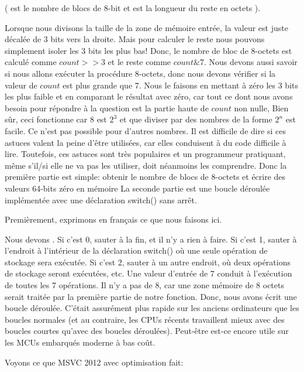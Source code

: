 (  est le nombre de blocs de 8-bit et  est la longueur du reste en octets ).

Lorsque nous divisons la taille de la zone de mémoire entrée, la valeur est juste
décalée de 3 bits vers la droite.
Mais pour calculer le reste nous pouvons simplement isoler les 3 bits les plus bas!
Donc, le nombre de bloc de 8-octets est calculé comme $count>>3$ et le reste comme
$count \& 7$.
Nous devons aussi savoir si nous allons exécuter la procédure 8-octets, donc nous
devons vérifier si la valeur de $count$ est plus grande que 7.
Nous le faisons en mettant à zéro les 3 bits les plus faible et en comparant le résultat
avec zéro, car tout ce dont nous avons besoin pour répondre à la question est la partie
haute de $count$ non nulle,
Bien sûr, ceci fonctionne car 8 est $2^{3}$ et que diviser par des nombres de la
forme $2^n$ est facile.
Ce n'est pas possible pour d'autres nombres.
Il est difficile de dire si ces astuces valent la peine d'être utilisées, car elles
conduisent à du code difficile à lire.
Toutefois, ces astuces sont très populaires et un programmeur pratiquant, même s'il/si elle
ne va pas les utiliser, doit néanmoins les comprendre.
Donc la première partie est simple: obtenir le nombre de blocs de 8-octets et écrire
des valeurs 64-bits zéro en mémoire
La seconde partie est une boucle déroulée implémentée avec une déclaration switch()
sans arrêt.

Premièrement, exprimons en français ce que nous faisons ici.

Nous devons .
Si c'est 0, sauter à la fin, et il n'y a rien à faire.
Si c'est 1, sauter à l'endroit à l'intérieur de la déclaration switch() où une seule
opération de stockage sera exécutée.
Si c'est 2, sauter à un autre endroit, où deux opérations de stockage seront exécutées, etc.
Une valeur d'entrée de 7 conduit à l'exécution de toutes les 7 opérations.
Il n'y a pas de 8, car une zone mémoire de 8 octets serait traitée par la première
partie de notre fonction.
Donc, nous avons écrit une boucle déroulée.
C'était assurément plus rapide sur les anciens ordinateurs que les boucles normales
(et au contraire, les \ac{CPU}s récents travaillent mieux avec des boucles courtes
qu'avec des boucles déroulées).
Peut-être est-ce encore utile sur les \ac{MCU}s embarqués moderne à bas coût.

Voyons ce que MSVC 2012 avec optimisation fait:



